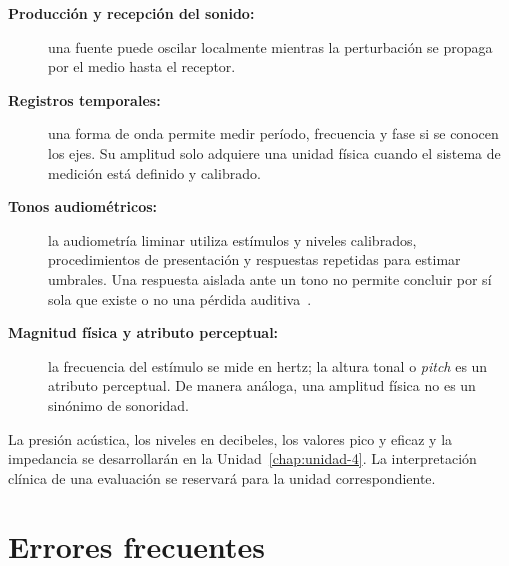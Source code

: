 \begin{description}
    \item[\textbf{Producción y recepción del sonido:}]
    una fuente puede oscilar localmente mientras la perturbación se propaga
    por el medio hasta el receptor.
    \item[\textbf{Registros temporales:}]
    una forma de onda permite medir período, frecuencia y fase si se conocen
    los ejes. Su amplitud solo adquiere una unidad física cuando el sistema de
    medición está definido y calibrado.
    \item[\textbf{Tonos audiométricos:}]
    la audiometría liminar utiliza estímulos y niveles calibrados,
    procedimientos de presentación y respuestas repetidas para estimar
    umbrales. Una respuesta aislada ante un tono no permite concluir por sí
    sola que existe o no una pérdida auditiva~\cite{ashaPureTone2005,iso8253_1_2010}.
    \item[\textbf{Magnitud física y atributo perceptual:}]
    la frecuencia del estímulo se mide en hertz; la altura tonal o
    \emph{pitch} es un atributo perceptual. De manera análoga, una amplitud
    física no es un sinónimo de sonoridad.
\end{description}

La presión acústica, los niveles en decibeles, los valores pico y eficaz y la
impedancia se desarrollarán en la Unidad~\ref{chap:unidad-4}. La
interpretación clínica de una evaluación se reservará para la unidad
correspondiente.

\section{Errores frecuentes}
\label{sec:u3-errores}

